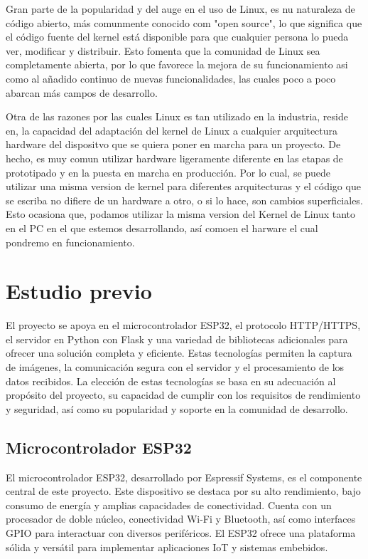 Gran parte de la popularidad y del auge en el uso de Linux, es nu naturaleza de código abierto, más comunmente conocido com "open source", lo que significa que el código fuente del kernel está disponible para que cualquier persona lo pueda ver, modificar y distribuir. Esto fomenta que la comunidad de Linux sea completamente abierta, por lo que favorece la mejora de su funcionamiento asi como al añadido continuo de nuevas funcionalidades, las cuales poco a poco abarcan más campos de desarrollo.

Otra de las razones por las cuales Linux es tan utilizado en la industria, reside en, la capacidad del adaptación del kernel de Linux a cualquier arquitectura hardware del dispositvo que se quiera poner en marcha para un proyecto. De hecho, es muy comun utilizar hardware ligeramente diferente en las etapas de prototipado y en la puesta en marcha en producción. Por lo cual, se puede utilizar una misma version de kernel para diferentes arquitecturas y el código que se escriba no difiere de un hardware a otro, o si lo hace, son cambios superficiales. Esto ocasiona que, podamos utilizar la misma version del Kernel de Linux tanto en el PC en el que estemos desarrollando, así comoen el harware el cual pondremo en funcionamiento.

\section{Estudio previo}
El proyecto se apoya en el microcontrolador ESP32, el protocolo HTTP/HTTPS, el servidor en Python con Flask y una variedad de bibliotecas adicionales para ofrecer una solución completa y eficiente. Estas tecnologías permiten la captura de imágenes, la comunicación segura con el servidor y el procesamiento de los datos recibidos. La elección de estas tecnologías se basa en su adecuación al propósito del proyecto, su capacidad de cumplir con los requisitos de rendimiento y seguridad, así como su popularidad y soporte en la comunidad de desarrollo.

\subsection{Microcontrolador ESP32}
El microcontrolador ESP32, desarrollado por Espressif Systems, es el componente central de este proyecto. Este dispositivo se destaca por su alto rendimiento, bajo consumo de energía y amplias capacidades de conectividad. Cuenta con un procesador de doble núcleo, conectividad Wi-Fi y Bluetooth, así como interfaces GPIO para interactuar con diversos periféricos. El ESP32 ofrece una plataforma sólida y versátil para implementar aplicaciones IoT y sistemas embebidos.

